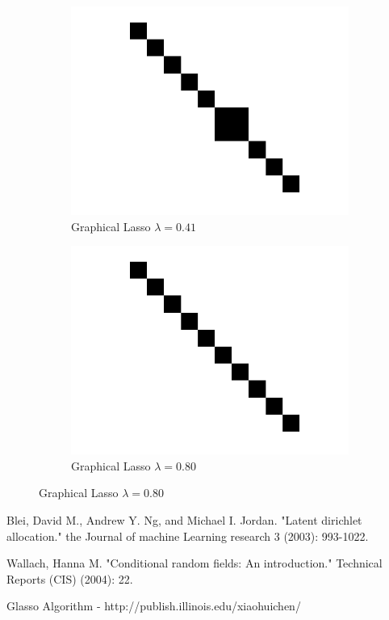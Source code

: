\documentclass{article}
\begin{document}
\begin{enumerate}
\begin{figure}[ht!]
\begin{subfigure}{.5\textwidth}
  \centering
  \includegraphics[width=.8\linewidth]{glasso_0_41.png}
  \caption{Graphical Lasso $\lambda=0.41$}
\end{subfigure}%
\begin{subfigure}{.5\textwidth}
  \centering
  \includegraphics[width=.8\linewidth]{glasso_0_80.png}
  \caption{Graphical Lasso $\lambda=0.80$}
\end{subfigure}

\end{figure}


\end{enumerate}




\newpage

\begin{thebibliography}{1}

   Blei, David M., Andrew Y. Ng, and Michael I. Jordan. "Latent dirichlet allocation." the Journal of machine Learning research 3 (2003): 993-1022.

   Wallach, Hanna M. "Conditional random fields: An introduction." Technical Reports (CIS) (2004): 22.
  
   Glasso Algorithm - http://publish.illinois.edu/xiaohuichen/

\end{thebibliography}
\end{document}
